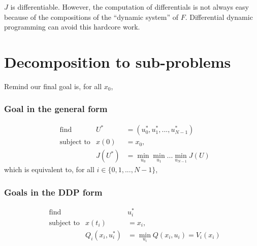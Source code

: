 \documentclass{report}
\begin{document}
$J$ is differentiable. However, the computation of differentials is not always easy because of the compositions of the ``dynamic system'' of $F$. Differential dynamic programming can avoid this hardcore work.

\section{Decomposition to sub-problems}
Remind our final goal is, for all $x_0$,

\subsubsection{Goal in the general form}

\begin{equation}
\begin{aligned}
&\text{find}             &U^* & = (u_0^*, u_1^*, ... , u_{N-1}^*) \\
&\text{subject to}       &x(0)      &= x_0,  \\
&							      &J(U^*)  &= \min_{u_0} \min_{u_1} ... \min_{u_{N-1}} J(U)
\end{aligned}
\end{equation}
%
which is equivalent to, for all $i\in \{0, 1, ..., N-1\}$,

\subsubsection{Goals in the DDP form}

\begin{equation}
\begin{aligned}
&\text{find}             && u_i^* \\
&\text{subject to}       &x(t_i)      &= x_i,  \\
&							      &Q_i(x_i, u_i^*) &= \min_{u_i} Q(x_i, u_i) = V_i(x_i)
\end{aligned}
\end{equation}
\end{document}
